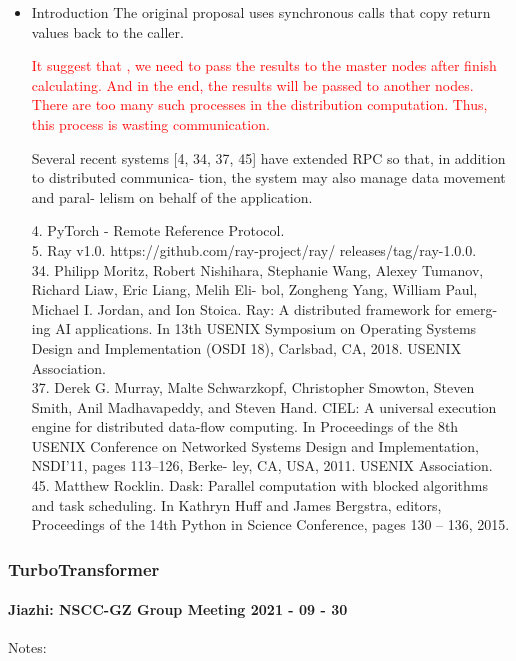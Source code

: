 \documentclass[UTF8]{article}
\newcommand{\com}[1]{\textcolor{red}{#1}}
\begin{document}
\begin{itemize}
	
	\item Introduction
	The original proposal uses synchronous calls that copy return values back to the caller. 
	
	\com{It suggest that , we need to pass the results to the master nodes after finish calculating. And in the end, the results will be passed to another nodes. There are too many such processes in the distribution computation. Thus, this process is wasting communication.} 
	
	Several recent systems [4, 34, 37, 45] have extended RPC so that, in addition to distributed communica- tion, the system may also manage data movement and paral- lelism on behalf of the application.
	
	4. PyTorch - Remote Reference Protocol. \\
	5. Ray v1.0. https://github.com/ray-project/ray/ releases/tag/ray-1.0.0.\\
	34. Philipp Moritz, Robert Nishihara, Stephanie Wang, Alexey Tumanov, Richard Liaw, Eric Liang, Melih Eli- bol, Zongheng Yang, William Paul, Michael I. Jordan, and Ion Stoica. Ray: A distributed framework for emerg- ing AI applications. In 13th USENIX Symposium on Operating Systems Design and Implementation (OSDI 18), Carlsbad, CA, 2018. USENIX Association.\\
	37. Derek G. Murray, Malte Schwarzkopf, Christopher Smowton, Steven Smith, Anil Madhavapeddy, and Steven Hand. CIEL: A universal execution engine for distributed data-flow computing. In Proceedings of the 8th USENIX Conference on Networked Systems Design and Implementation, NSDI’11, pages 113–126, Berke- ley, CA, USA, 2011. USENIX Association.\\
	45. Matthew Rocklin. Dask: Parallel computation with blocked algorithms and task scheduling. In Kathryn Huff and James Bergstra, editors, Proceedings of the 14th Python in Science Conference, pages 130 – 136, 2015.\\

\end{itemize}
\subsubsection{TurboTransformer}
\paragraph{Jiazhi: NSCC-GZ Group Meeting 2021 - 09 - 30}
Notes:
\end{document}
